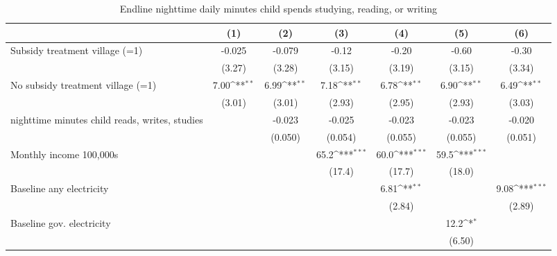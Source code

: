 \begin{table}[htbp]\centering
\def\sym#1{\ifmmode^{#1}\else\(^{#1}\)\fi}
\caption{Endline nighttime daily minutes child spends studying, reading, or writing}
\begin{tabular*}{1\hsize}{@{\hskip\tabcolsep\extracolsep\fill}l*{6}{c}}
\toprule
                &\multicolumn{1}{c}{(1)}         &\multicolumn{1}{c}{(2)}         &\multicolumn{1}{c}{(3)}         &\multicolumn{1}{c}{(4)}         &\multicolumn{1}{c}{(5)}         &\multicolumn{1}{c}{(6)}         \\
\midrule
Subsidy treatment village (=1)&   -0.025         &   -0.079         &    -0.12         &    -0.20         &    -0.60         &    -0.30         \\
                &   (3.27)         &   (3.28)         &   (3.15)         &   (3.19)         &   (3.15)         &   (3.34)         \\
No subsidy treatment village (=1)&     7.00\sym{**} &     6.99\sym{**} &     7.18\sym{**} &     6.78\sym{**} &     6.90\sym{**} &     6.49\sym{**} \\
                &   (3.01)         &   (3.01)         &   (2.93)         &   (2.95)         &   (2.93)         &   (3.03)         \\
nighttime minutes child reads, writes, studies&                  &   -0.023         &   -0.025         &   -0.023         &   -0.023         &   -0.020         \\
                &                  &  (0.050)         &  (0.054)         &  (0.055)         &  (0.055)         &  (0.051)         \\
Monthly income 100,000s&                  &                  &     65.2\sym{***}&     60.0\sym{***}&     59.5\sym{***}&                  \\
                &                  &                  &   (17.4)         &   (17.7)         &   (18.0)         &                  \\
Baseline any electricity&                  &                  &                  &     6.81\sym{**} &                  &     9.08\sym{***}\\
                &                  &                  &                  &   (2.84)         &                  &   (2.89)         \\
Baseline gov. electricity&                  &                  &                  &                  &     12.2\sym{*}  &                  \\
                &                  &                  &                  &                  &   (6.50)         &                  \\

\end{tabular*}
\end{table}
